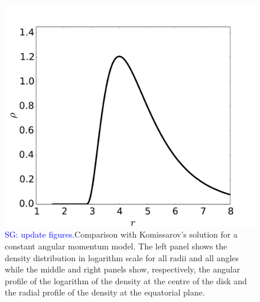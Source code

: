 \documentclass{aa}
\newcommand{\sg}[1]{\textcolor{blue}{SG: #1}}
\begin{document}
\begin{figure}[t]
\includegraphics[scale=0.16]{figures/fig1c.pdf}
\caption{\sg{update figures.}Comparison with Komissarov's solution for a constant angular momentum model. The left panel shows the density distribution in logarithm scale for all radii and all angles while the middle and right panels show, respectively, the angular profile of the logarithm of the density at the centre of the disk and the radial profile of the density at the equatorial plane.}
           \label{komissarov}%
 \end{figure}
\end{document}
